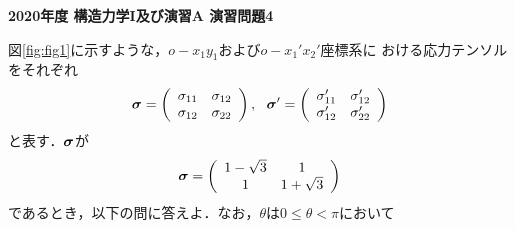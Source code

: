 \documentclass[10pt,a4j]{jarticle}
\newlength{\minitwocolumn}
\begin{document}
\newcommand{\fat}[1]{\mbox{\boldmath $#1$}}
\newcommand{\D}{\partial}
\newcommand{\w}{\omega}
\newcommand{\ga}{\alpha}
\newcommand{\gb}{\beta}
\newcommand{\gx}{\xi}
\newcommand{\gz}{\zeta}
\newcommand{\vhat}[1]{\hat{\fat{#1}}}
\newcommand{\spc}{\vspace{0.7\baselineskip}}
\newcommand{\halfspc}{\vspace{0.3\baselineskip}}

\pagestyle{empty}
\newcommand{\twofig}[2]
 {
   \begin{figure}[here]
     \begin{minipage}[t]{\minitwocolumn}
         \begin{center}   #1
         \end{center}
     \end{minipage}
         \hspace{\columnsep}
     \begin{minipage}[t]{\minitwocolumn}
         \begin{center} #2
         \end{center}
     \end{minipage}
   \end{figure}
 }
\begin{center}
	{\Large \bf 2020年度 構造力学I及び演習A 演習問題4 }
\end{center}
\vspace{15mm}
	図\ref{fig:fig1}に示すような，$o-x_1 y_1$および$o-x_1'x_2'$座標系に
	おける応力テンソルをそれぞれ
\[
	\fat{\sigma}
	=
	\left( 
		\begin{array}{cc}
		\sigma_{11} & \sigma_{12} \\
		\sigma_{12} & \sigma_{22} 
		\end{array}
	\right)
	, 
	\ \
	\fat{\sigma}'
	=
	\left( 
		\begin{array}{cc}
		\sigma_{11}' & \sigma_{12}' \\
		\sigma_{12}' & \sigma_{22}'
		\end{array}
	\right)
\]
	と表す．$\fat{\sigma}$が
\begin{equation}
	\fat{\sigma}
	=
	\left( 
		\begin{array}{cc}
			1-\sqrt{3} & 1\\
			1 & 1+\sqrt{3} 
		\end{array}
	\right)
	\label{eqn:sigma}
\end{equation}
であるとき，以下の問に答えよ．なお，$\theta$は$0 \leq \theta < \pi$において
\end{document}
